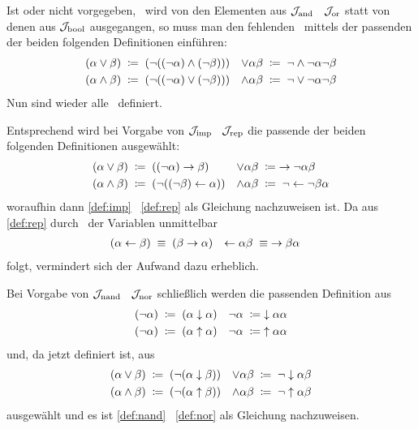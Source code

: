 Ist \chrqt{\symlor} oder \chrqt{\symland} nicht vorgegeben, \textdh\ wird von den Elementen aus $\mathcal{J}_{\mathrm{and}}$ \textbzgl\ $\mathcal{J}_{\mathrm{or}}$ statt von denen aus $\mathcal{J}_{\mathrm{bool}}$ ausgegangen, so muss man den fehlenden \Junktor\ mittels der passenden der beiden folgenden Definitionen einführen:
\begin{align}
	(\alpha \lor \beta)  & \;\coloneqq\; (\lnot((\lnot\alpha)\land(\lnot\beta))) &
	\lor \alpha  \beta   & \;\coloneqq\;  \lnot \land \lnot \alpha \lnot \beta
	\label{def:orand} \\
	(\alpha \land \beta) & \;\coloneqq\; (\lnot((\lnot\alpha)\lor(\lnot\beta)))  &
	\land \alpha  \beta  & \;\coloneqq\;  \lnot \lor \lnot \alpha \lnot \beta
	\label{def:andor}
\end{align}
Nun sind wieder alle \Junktoren\ definiert.

Entsprechend wird bei Vorgabe von $\mathcal{J}_{\mathrm{imp}}$ \textbzgl\ $\mathcal{J}_{\mathrm{rep}}$ die passende der beiden folgenden Definitionen ausgewählt:
\begin{align}
	(\alpha \lor  \beta) & \;\coloneqq\; ((\lnot \alpha) \rightarrow \beta)         &
	\lor \alpha   \beta  & \;\coloneqq\;   \rightarrow \lnot \alpha \beta
	\label{def:orrep}
	\\
	(\alpha \land \beta) & \;\coloneqq\; (\lnot ((\lnot \beta) \leftarrow \alpha)) &
	\land \alpha  \beta  & \;\coloneqq\;  \lnot \leftarrow \lnot \beta \alpha
	\label{def:andrep}
\end{align}
woraufhin dann \eqref{def:imp} \textbzgl\ \eqref{def:rep} als Gleichung nachzuweisen ist.
Da aus \eqref{def:rep} durch \Vertauschung\ der Variablen unmittelbar
\begin{align}
	(\alpha \leftarrow \beta) & \;\equiv\; (\beta \rightarrow \alpha) &
	\leftarrow \alpha  \beta  & \;\equiv\;  \rightarrow \beta \alpha  \label{eq:repimp}
\end{align}
folgt, vermindert sich der Aufwand dazu erheblich.

Bei Vorgabe von $\mathcal{J}_{\mathrm{nand}}$ \textbzgl\ $\mathcal{J}_{\mathrm{nor}}$ schließlich werden die passenden Definition aus
\begin{align}
	(\lnot \alpha) & \;\coloneqq\; (\alpha \downarrow \alpha)  &
	\lnot  \alpha  & \;\coloneqq\;  \downarrow \alpha \alpha   \label{def:notnor} \\
	(\lnot \alpha) & \;\coloneqq\; (\alpha \uparrow \alpha) &
	\lnot  \alpha  & \;\coloneqq\;  \uparrow \alpha \alpha  \label{def:notnand}
\end{align}
und, da \chrqt{\symlnot} jetzt definiert ist, aus
\begin{align}
	(\alpha \lor \beta)  & \;\coloneqq\; (\lnot(\alpha \downarrow \beta))  &
	\lor \alpha  \beta   & \;\coloneqq\;  \lnot \downarrow \alpha \beta
	\label{def:ornor} \\
	(\alpha \land \beta) & \;\coloneqq\; (\lnot(\alpha \uparrow \beta)) &
	\land \alpha  \beta  & \;\coloneqq\;  \lnot \uparrow \alpha \beta
	\label{def:andnand}
\end{align}
ausgewählt und es ist \eqref{def:nand} \textbzgl\ \eqref{def:nor} als Gleichung nachzuweisen.

